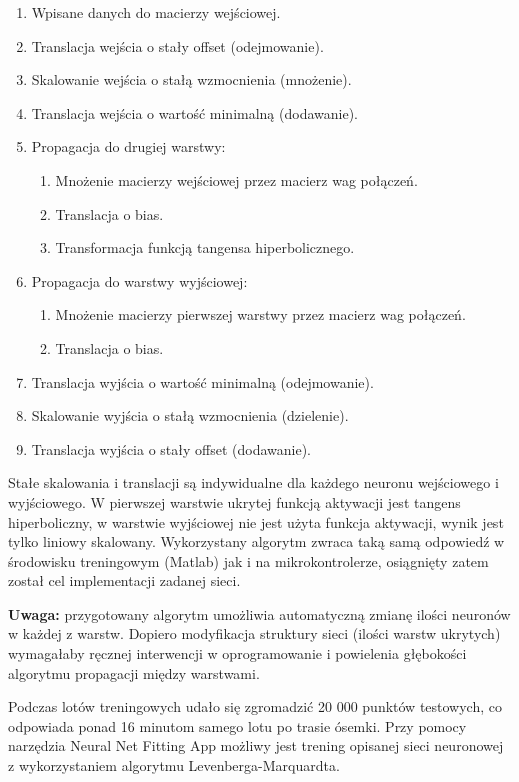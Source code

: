 \documentclass[12pt, a4paper]{article}
\begin{document}
\begin{enumerate}
    \item Wpisane danych do macierzy wejściowej.
	\item Translacja wejścia o stały offset (odejmowanie).
	\item Skalowanie wejścia o stałą wzmocnienia (mnożenie).
	\item Translacja wejścia o wartość minimalną (dodawanie).
	\item Propagacja do drugiej warstwy:
	\begin{enumerate}
		\item Mnożenie macierzy wejściowej przez macierz wag połączeń.
		\item Translacja o bias.
		\item Transformacja funkcją tangensa hiperbolicznego.
	\end{enumerate}
	\item Propagacja do warstwy wyjściowej:
	\begin{enumerate}
		\item Mnożenie macierzy pierwszej warstwy przez macierz wag połączeń.
		\item Translacja o bias.
	\end{enumerate}
	\item Translacja wyjścia o wartość minimalną (odejmowanie).
	\item Skalowanie wyjścia o stałą wzmocnienia (dzielenie).
	\item Translacja wyjścia o stały offset (dodawanie).
\end{enumerate}

Stałe skalowania i translacji są indywidualne dla każdego neuronu wejściowego i wyjściowego. W pierwszej warstwie ukrytej funkcją aktywacji jest tangens hiperboliczny, w warstwie wyjściowej nie jest użyta funkcja aktywacji, wynik jest tylko liniowy skalowany. Wykorzystany algorytm zwraca taką samą odpowiedź w środowisku treningowym (Matlab) jak i na mikrokontrolerze, osiągnięty zatem został cel implementacji zadanej sieci.

\textbf{Uwaga:} przygotowany algorytm umożliwia automatyczną zmianę ilości neuronów w każdej z warstw. Dopiero modyfikacja struktury sieci (ilości warstw ukrytych) wymagałaby ręcznej interwencji w oprogramowanie i powielenia głębokości algorytmu propagacji między warstwami.

Podczas lotów treningowych udało się zgromadzić 20 000 punktów testowych, co odpowiada ponad 16 minutom samego lotu po trasie ósemki. Przy pomocy narzędzia Neural Net Fitting App możliwy jest trening opisanej sieci neuronowej z wykorzystaniem algorytmu Levenberga-Marquardta. 
\end{document}
